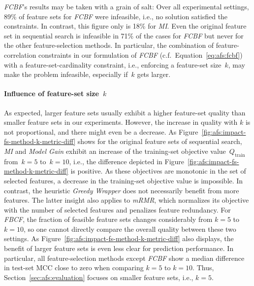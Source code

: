 \documentclass{article}
\theoremstyle{definition}
\begin{document}
\emph{FCBF}'s results may be taken with a grain of salt:
Over all experimental settings, 89\% of feature sets for \emph{FCBF} were infeasible, i.e., no solution satisfied the constraints.
In contrast, this figure only is 18\% for \emph{MI}.
Even the original feature set in sequential search is infeasible in 71\% of the cases for \emph{FCBF} but never for the other feature-selection methods.
In particular, the combination of feature-correlation constraints in our formulation of \emph{FCBF} (c.f.~Equation~\ref{eq:afs:fcbf}) with a feature-set-cardinality constraint, i.e., enforcing a feature-set size~$k$, may make the problem infeasible, especially if~$k$ gets larger.

\paragraph{Influence of feature-set size~$k$}

As expected, larger feature sets usually exhibit a higher feature-set quality than smaller feature sets in our experiments.
However, the increase in quality with $k$ is not proportional, and there might even be a decrease.
As Figure~\ref{fig:afs:impact-fs-method-k-metric-diff} shows for the original feature sets of sequential search, \emph{MI} and \emph{Model Gain} exhibit an increase of the training-set objective value~$Q_\text{train}$ from~$k=5$ to~$k=10$, i.e., the difference depicted in Figure~\ref{fig:afs:impact-fs-method-k-metric-diff} is positive.
As these objectives are monotonic in the set of selected features, a decrease in the training-set objective value is impossible.
In contrast, the heuristic \emph{Greedy Wrapper} does not necessarily benefit from more features.
The latter insight also applies to \emph{mRMR}, which normalizes its objective with the number of selected features and penalizes feature redundancy.
For \emph{FBCF}, the fraction of feasible feature sets changes considerably from $k=5$ to $k=10$, so one cannot directly compare the overall quality between these two settings.
As Figure~\ref{fig:afs:impact-fs-method-k-metric-diff} also displays, the benefit of larger feature sets is even less clear for prediction performance.
In particular, all feature-selection methods except \emph{FCBF} show a median difference in test-set MCC close to zero when comparing $k=5$ to $k=10$.
Thus, Section~\ref{sec:afs:evaluation} focuses on smaller feature sets, i.e., $k=5$.

\renewcommand*{\bibfont}{\small} %
\printbibliography
\end{document}
